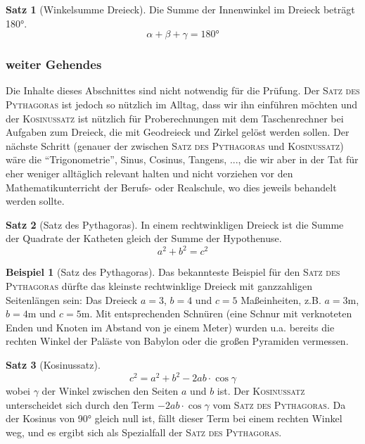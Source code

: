 \documentclass[a4paper]{book}%
\theoremstyle{definition}
\newtheorem{beispiel}{Beispiel}
\newtheorem{satz}{Satz}
\begin{document}
\begin{satz}[Winkelsumme Dreieck]
    Die Summe der Innenwinkel im Dreieck beträgt 180°.
    \begin{equation}\label{eqn:DreieckInnenwinkel}
        \alpha + \beta + \gamma = 180°
    \end{equation}
\end{satz}


\subsubsection{weiter Gehendes}

Die Inhalte dieses Abschnittes sind nicht notwendig für die Prüfung. Der \textsc{Satz des Pythagoras} ist jedoch so nützlich im Alltag, dass wir ihn einführen möchten und der \textsc{Kosinussatz} ist nützlich für Proberechnungen mit dem Taschenrechner bei Aufgaben zum Dreieck, die mit Geodreieck und Zirkel gelöst werden sollen. Der nächste Schritt (genauer der zwischen \textsc{Satz des Pythagoras} und \textsc{Kosinussatz}) wäre die \enquote{Trigonometrie}, Sinus, Cosinus, Tangens, ..., die wir aber in der Tat für eher weniger alltäglich relevant halten und nicht vorziehen vor den Mathematikunterricht der Berufs- oder Realschule, wo dies jeweils behandelt werden sollte.

\begin{satz}[Satz des Pythagoras]\label{satz:SatzDesPythagoras}
    In einem rechtwinkligen Dreieck ist die Summe der Quadrate der Katheten gleich der Summe der Hypothenuse.
    \begin{equation}\label{eqn:SatzDesPythagoras}
        a^2 + b^2 = c^2
    \end{equation}
\end{satz}

\begin{beispiel}[Satz des Pythagoras]
    Das bekannteste Beispiel für den \textsc{Satz des Pythagoras} dürfte das kleinste rechtwinklige Dreieck mit ganzzahligen Seitenlängen sein: Das Dreieck $a=3$, $b=4$ und $c=5$ Maßeinheiten, z.B. $a=3\text{m}$, $b=4\text{m}$ und $c=5\text{m}$. Mit entsprechenden Schnüren (eine Schnur mit verknoteten Enden und Knoten im Abstand von je einem Meter) wurden u.a. bereits die rechten Winkel der Paläste von Babylon oder die großen Pyramiden vermessen.
\end{beispiel}

\begin{satz}[Kosinussatz]\label{satz:Kosinussatz}
    \begin{equation}\label{eqn:Kosinussatz}
        c^2 = a^2 + b^2 - 2ab \cdot \cos \gamma
    \end{equation}
    wobei $\gamma$ der Winkel zwischen den Seiten $a$ und $b$ ist. Der \textsc{Kosinussatz} unterscheidet sich durch den Term $-2ab \cdot \cos \gamma$ vom \textsc{Satz des Pythagoras}. Da der Kosinus von 90° gleich null ist, fällt dieser Term bei einem rechten Winkel weg, und es ergibt sich als Spezialfall der \textsc{Satz des Pythagoras}.
\end{satz}
\end{document}
